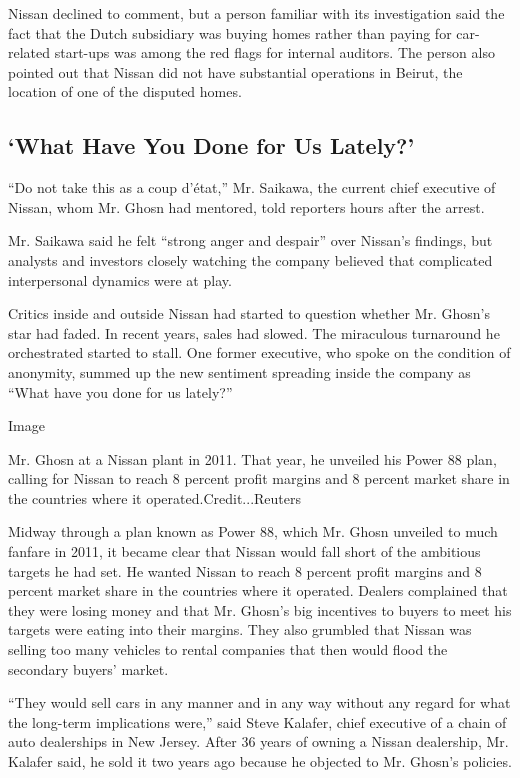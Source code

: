 Nissan declined to comment, but a person familiar with its investigation
said the fact that the Dutch subsidiary was buying homes rather than
paying for car-related start-ups was among the red flags for internal
auditors. The person also pointed out that Nissan did not have
substantial operations in Beirut, the location of one of the disputed
homes.

\hypertarget{what-have-you-done-for-us-lately}{%
\subsection{`What Have You Done for Us
Lately?'}\label{what-have-you-done-for-us-lately}}

``Do not take this as a coup d'état,'' Mr. Saikawa, the current chief
executive of Nissan, whom Mr. Ghosn had mentored, told reporters hours
after the arrest.

Mr. Saikawa said he felt ``strong anger and despair'' over Nissan's
findings, but analysts and investors closely watching the company
believed that complicated interpersonal dynamics were at play.

Critics inside and outside Nissan had started to question whether Mr.
Ghosn's star had faded. In recent years, sales had slowed. The
miraculous turnaround he orchestrated started to stall. One former
executive, who spoke on the condition of anonymity, summed up the new
sentiment spreading inside the company as ``What have you done for us
lately?''

Image

Mr. Ghosn at a Nissan plant in 2011. That year, he unveiled his Power 88
plan, calling for Nissan to reach 8 percent profit margins and 8 percent
market share in the countries where it operated.Credit...Reuters

Midway through a plan known as Power 88, which Mr. Ghosn unveiled to
much fanfare in 2011, it became clear that Nissan would fall short of
the ambitious targets he had set. He wanted Nissan to reach 8 percent
profit margins and 8 percent market share in the countries where it
operated. Dealers complained that they were losing money and that Mr.
Ghosn's big incentives to buyers to meet his targets were eating into
their margins. They also grumbled that Nissan was selling too many
vehicles to rental companies that then would flood the secondary buyers'
market.

``They would sell cars in any manner and in any way without any regard
for what the long-term implications were,'' said Steve Kalafer, chief
executive of a chain of auto dealerships in New Jersey. After 36 years
of owning a Nissan dealership, Mr. Kalafer said, he sold it two years
ago because he objected to Mr. Ghosn's policies.

